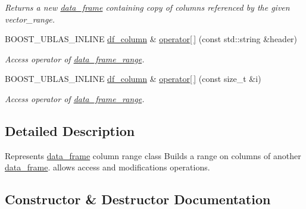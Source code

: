 \begin{DoxyCompactItemize}
\begin{DoxyCompactList}\small\item\em Returns a new \hyperlink{classboost_1_1numeric_1_1ublas_1_1data__frame}{data\+\_\+frame} containing copy of columns referenced by the given vector\+\_\+range. \end{DoxyCompactList}\item 
B\+O\+O\+S\+T\+\_\+\+U\+B\+L\+A\+S\+\_\+\+I\+N\+L\+I\+NE \hyperlink{classboost_1_1numeric_1_1ublas_1_1df__column}{df\+\_\+column} \& \hyperlink{classboost_1_1numeric_1_1ublas_1_1data__frame__range_a83d56dfe9f2ce86eba4c9255eb17b2bb}{operator\mbox{[}$\,$\mbox{]}} (const std\+::string \&header)
\begin{DoxyCompactList}\small\item\em Access operator of \hyperlink{classboost_1_1numeric_1_1ublas_1_1data__frame__range}{data\+\_\+frame\+\_\+range}. \end{DoxyCompactList}\item 
B\+O\+O\+S\+T\+\_\+\+U\+B\+L\+A\+S\+\_\+\+I\+N\+L\+I\+NE \hyperlink{classboost_1_1numeric_1_1ublas_1_1df__column}{df\+\_\+column} \& \hyperlink{classboost_1_1numeric_1_1ublas_1_1data__frame__range_aea4194a8602095f16e62b63dd0e16add}{operator\mbox{[}$\,$\mbox{]}} (const size\+\_\+t \&i)
\begin{DoxyCompactList}\small\item\em Access operator of \hyperlink{classboost_1_1numeric_1_1ublas_1_1data__frame__range}{data\+\_\+frame\+\_\+range}. \end{DoxyCompactList}\end{DoxyCompactItemize}


\subsection{Detailed Description}
Represents \hyperlink{classboost_1_1numeric_1_1ublas_1_1data__frame}{data\+\_\+frame} column range class Builds a range on columns of another \hyperlink{classboost_1_1numeric_1_1ublas_1_1data__frame}{data\+\_\+frame}. allows access and modifications operations. 

\subsection{Constructor \& Destructor Documentation}
